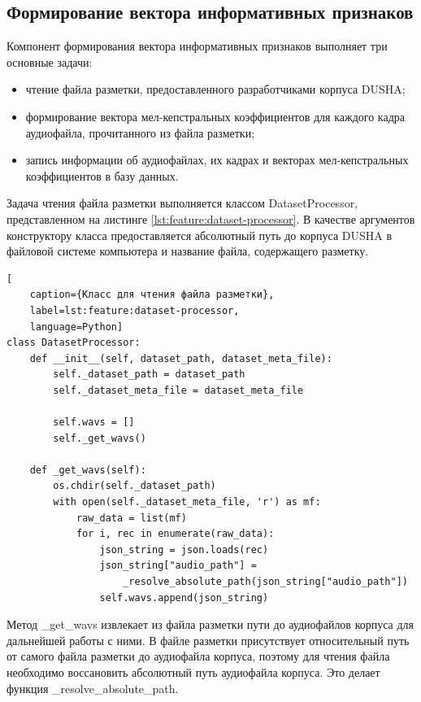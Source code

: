 \subsection{Формирование вектора информативных признаков}
Компонент формирования вектора информативных признаков выполняет три основные задачи:
\begin{itemize}
	\item чтение файла разметки, предоставленного разработчиками корпуса DUSHA;
	\item формирование вектора мел-кепстральных коэффициентов для каждого кадра аудиофайла, прочитанного из файла разметки;
	\item запись информации об аудиофайлах, их кадрах и векторах мел-кепстральных коэффициентов в базу данных.
\end{itemize}
Задача чтения файла разметки выполняется классом DatasetProcessor, представленном на листинге \ref{lst:feature:dataset-processor}. В качестве аргументов конструктору класса предоставляется абсолютный путь до корпуса DUSHA в файловой системе компьютера и название файла, содержащего разметку.
\begin{lstlisting}[
	caption={Класс для чтения файла разметки},
	label=lst:feature:dataset-processor,
	language=Python]
class DatasetProcessor:
    def __init__(self, dataset_path, dataset_meta_file):
        self._dataset_path = dataset_path
        self._dataset_meta_file = dataset_meta_file

        self.wavs = []
        self._get_wavs()

    def _get_wavs(self):
        os.chdir(self._dataset_path)
        with open(self._dataset_meta_file, 'r') as mf:
            raw_data = list(mf)
            for i, rec in enumerate(raw_data):
                json_string = json.loads(rec)
                json_string["audio_path"] =
                	_resolve_absolute_path(json_string["audio_path"])
                self.wavs.append(json_string)
\end{lstlisting}
Метод \_get\_wavs извлекает из файла разметки пути до аудиофайлов корпуса для дальнейшей работы с ними. В файле разметки присутствует относительный путь от самого файла разметки до аудиофайла корпуса, поэтому для чтения файла необходимо воссановить абсолютный путь аудиофайла корпуса. Это делает функция \_resolve\_absolute\_path.

